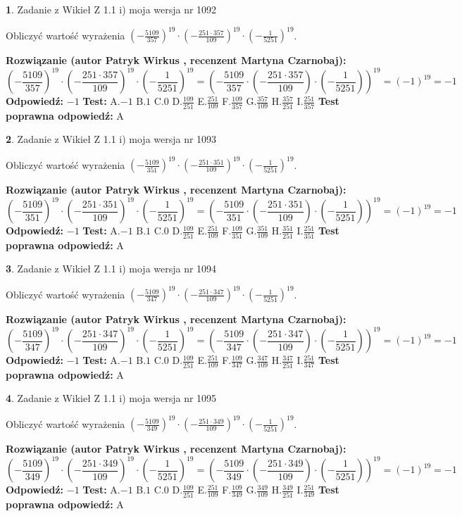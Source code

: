 \documentclass[12pt, a4paper]{article}
\theoremstyle{definition} %
\newtheorem{zad}{}
\newcommand{\zadStart}[1]{\begin{zad}#1\newline}
\newcommand{\zadStop}{\end{zad}}
\newcommand{\rozwStart}[2]{\noindent \textbf{Rozwiązanie (autor #1 , recenzent #2): }\newline}
\newcommand{\rozwStop}{\newline}
\newcommand{\odpStart}{\noindent \textbf{Odpowiedź:}\newline}
\newcommand{\odpStop}{\newline}
\newcommand{\testStart}{\noindent \textbf{Test:}\newline}
\newcommand{\testStop}{\newline}
\newcommand{\kluczStart}{\noindent \textbf{Test poprawna odpowiedź:}\newline}
\newcommand{\kluczStop}{\newline}
\begin{document}
\zadStart{Zadanie z Wikieł Z 1.1 i) moja wersja nr 1092}

Obliczyć wartość wyrażenia $(-\frac{5109}{357})^{19} \cdot (-\frac{251 \cdot 357}{109})^{19} \cdot (-\frac{1}{5251})^{19}$.
\zadStop
\rozwStart{Patryk Wirkus}{Martyna Czarnobaj}
$$(-\frac{5109}{357})^{19} \cdot (-\frac{251 \cdot 357}{109})^{19} \cdot (-\frac{1}{5251})^{19} = (-\frac{5109}{357} \cdot (-\frac{251 \cdot 357}{109}) \cdot (-\frac{1}{5251}))^{19} = (-1)^{19} = -1$$
\rozwStop
\odpStart
$-1$
\odpStop
\testStart
A.$-1$ B.$1$ C.$0$ D.$\frac{109}{251}$ E.$\frac{251}{109}$
F.$\frac{109}{357}$ G.$\frac{357}{109}$
H.$\frac{357}{251}$
I.$\frac{251}{357}$
\testStop
\kluczStart
A
\kluczStop



\zadStart{Zadanie z Wikieł Z 1.1 i) moja wersja nr 1093}

Obliczyć wartość wyrażenia $(-\frac{5109}{351})^{19} \cdot (-\frac{251 \cdot 351}{109})^{19} \cdot (-\frac{1}{5251})^{19}$.
\zadStop
\rozwStart{Patryk Wirkus}{Martyna Czarnobaj}
$$(-\frac{5109}{351})^{19} \cdot (-\frac{251 \cdot 351}{109})^{19} \cdot (-\frac{1}{5251})^{19} = (-\frac{5109}{351} \cdot (-\frac{251 \cdot 351}{109}) \cdot (-\frac{1}{5251}))^{19} = (-1)^{19} = -1$$
\rozwStop
\odpStart
$-1$
\odpStop
\testStart
A.$-1$ B.$1$ C.$0$ D.$\frac{109}{251}$ E.$\frac{251}{109}$
F.$\frac{109}{351}$ G.$\frac{351}{109}$
H.$\frac{351}{251}$
I.$\frac{251}{351}$
\testStop
\kluczStart
A
\kluczStop



\zadStart{Zadanie z Wikieł Z 1.1 i) moja wersja nr 1094}

Obliczyć wartość wyrażenia $(-\frac{5109}{347})^{19} \cdot (-\frac{251 \cdot 347}{109})^{19} \cdot (-\frac{1}{5251})^{19}$.
\zadStop
\rozwStart{Patryk Wirkus}{Martyna Czarnobaj}
$$(-\frac{5109}{347})^{19} \cdot (-\frac{251 \cdot 347}{109})^{19} \cdot (-\frac{1}{5251})^{19} = (-\frac{5109}{347} \cdot (-\frac{251 \cdot 347}{109}) \cdot (-\frac{1}{5251}))^{19} = (-1)^{19} = -1$$
\rozwStop
\odpStart
$-1$
\odpStop
\testStart
A.$-1$ B.$1$ C.$0$ D.$\frac{109}{251}$ E.$\frac{251}{109}$
F.$\frac{109}{347}$ G.$\frac{347}{109}$
H.$\frac{347}{251}$
I.$\frac{251}{347}$
\testStop
\kluczStart
A
\kluczStop



\zadStart{Zadanie z Wikieł Z 1.1 i) moja wersja nr 1095}

Obliczyć wartość wyrażenia $(-\frac{5109}{349})^{19} \cdot (-\frac{251 \cdot 349}{109})^{19} \cdot (-\frac{1}{5251})^{19}$.
\zadStop
\rozwStart{Patryk Wirkus}{Martyna Czarnobaj}
$$(-\frac{5109}{349})^{19} \cdot (-\frac{251 \cdot 349}{109})^{19} \cdot (-\frac{1}{5251})^{19} = (-\frac{5109}{349} \cdot (-\frac{251 \cdot 349}{109}) \cdot (-\frac{1}{5251}))^{19} = (-1)^{19} = -1$$
\rozwStop
\odpStart
$-1$
\odpStop
\testStart
A.$-1$ B.$1$ C.$0$ D.$\frac{109}{251}$ E.$\frac{251}{109}$
F.$\frac{109}{349}$ G.$\frac{349}{109}$
H.$\frac{349}{251}$
I.$\frac{251}{349}$
\testStop
\kluczStart
A
\kluczStop
\end{document}
